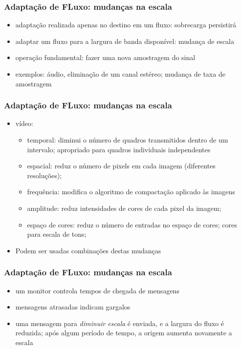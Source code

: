\documentclass[]{beamer}
\begin{document}
\begin{frame}
 \frametitle{Adaptação de FLuxo: mudanças na escala}
 \begin{itemize}
   \item adaptação realizada apenas no destino em um fluxo: sobrecarga persistirá
   \item adaptar um fluxo para a largura de banda disponível: mudança de escala
   \item operação fundamental: fazer uma nova amostragem do sinal
   \item exemplos: áudio, eliminação de um canal estéreo; mudança de taxa de amostragem
 \end{itemize}
\end{frame}

\begin{frame}
 \frametitle{Adaptação de FLuxo: mudanças na escala}
 \begin{itemize}
   \item vídeo: 
     \begin{itemize}
       \item temporal: diminui o número de quadros transmitidos dentro de um intervalo;
apropriado para quadros individuais independentes
        \item espacial: reduz o número de pixels em cada imagem (diferentes resoluções); 
        \item frequência: modifica o algoritmo de compactação aplicado às imagens
        \item amplitude: reduz intensidades de cores de cada pixel da imagem;
        \item espaço de cores: reduz o número de entradas no espaço de cores; cores para
escala de tons;
     \end{itemize}
     \item Podem ser usadas combinações destas mudanças
  \end{itemize}
\end{frame}

\begin{frame}
 \frametitle{Adaptação de FLuxo: mudanças na escala}
 \begin{itemize}
   \item um monitor controla tempos de chegada de mensagens
   \item mensagens atrasadas indicam gargalos
   \item uma mensagem para \emph{diminuir escala} é enviada, e a largura do fluxo é
reduzida; após algum período de tempo, a origem aumenta novamente a escala
  \end{itemize}
\end{frame}
\end{document}
